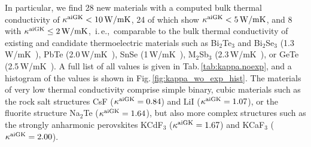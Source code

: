 In particular, we find 28 new materials with a computed bulk thermal conductivity of $\kappa^{\rm aiGK} < 10\,{\rm W/mK}$, 24 of which show $\kappa^{\rm aiGK} < 5\,{\rm W/mK}$, and 8 with $\kappa^{\rm aiGK} \leq 2\,{\rm W/mK}$,~i.\,e.,~comparable to the bulk thermal conductivity of existing and candidate thermoelectric materials such as Bi$_2$Te$_3$ and Bi$_2$Se$_3$ (1.3\,W/mK~\cite{Goldsmid1956,Satterthwaite1957}), PbTe (2.0\,W/mK~\cite{ElSharkawy1983}), SnSe (1\,W/mK~\cite{zhao2014,wei2016,sassi2014}), M$_2$Sb$_3$ (2.3\,W/mK~\cite{ahmadpour2007,pan2020}), or GeTe (2.5\,W/mK~\cite{Perumal2015}). A full list of all values is given in Tab.\,\ref{tab:kappa.noexp}, and a histogram of the values is shown in Fig.\,\ref{fig:kappa_wo_exp_hist}. The materials of very low thermal conductivity comprise simple binary, cubic materials such as the rock salt structures CsF ($\kappa^{\rm aiGK} = 0.84$) and LiI ($\kappa^{\rm aiGK} = 1.07$), or the fluorite structure Na$_2$Te ($\kappa^{\rm aiGK} = 1.64$), but also more complex structures such as the strongly anharmonic perovskites KCdF$_3$ ($\kappa^{\rm aiGK} = 1.67$) and KCaF$_3$ ($\kappa^{\rm aiGK} = 2.00$).


